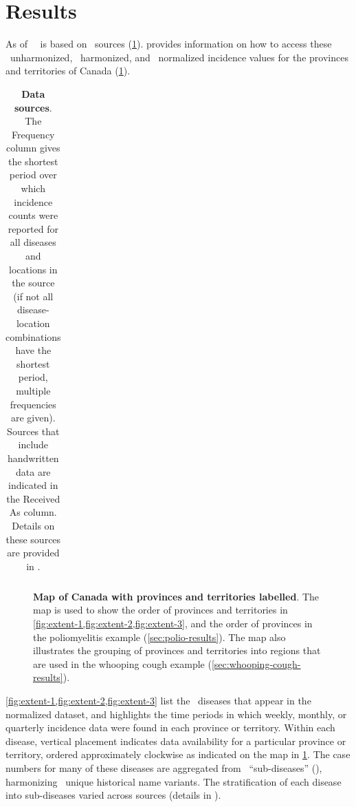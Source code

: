 \documentclass[12pt]{article}
\begin{document}
\section{Results}\label{sec:results}

As of \asofnow\ \datacronym\ is based on \ sources (\cref{tab:sources-table}).  provides information on how to access these \ unharmonized, \ harmonized, and \ normalized incidence values for the provinces and territories of Canada (\cref{fig:map}).

\begin{table}[!htb]
  \centering
  \caption{\textbf{Data sources}. The Frequency column gives the shortest period over which incidence counts were reported for all diseases and locations in the source (if not all disease-location combinations have the shortest period, multiple frequencies are given). Sources that include handwritten data are indicated in the Received As column. Details on these sources are provided in .} 
  \begin{tabular}{ll>{\raggedright\arraybackslash}p{0.11\linewidth}>{\raggedright\arraybackslash}p{0.25\linewidth}>{\raggedright\arraybackslash}p{0.2\linewidth}}  

\end{tabular}
\label{tab:sources-table}
\end{table}

\begin{figure}[!htb]
\caption{\textbf{Map of Canada with provinces and territories labelled}. The map is used to show the order of provinces and territories in \cref{fig:extent-1,fig:extent-2,fig:extent-3}, and the order of provinces in the poliomyelitis example (\cref{sec:polio-results}). The map also illustrates the grouping of provinces and territories into regions that are used in the whooping cough example (\cref{sec:whooping-cough-results}).}\label{fig:map}
\end{figure}

\newpage 

\cref{fig:extent-1,fig:extent-2,fig:extent-3} list the \ diseases that appear in the normalized dataset, and highlights the time periods in which weekly, monthly, or quarterly incidence data were found in each province or territory. Within each disease, vertical placement indicates data availability for a particular province or territory, ordered approximately clockwise as indicated on the map in \cref{fig:map}. The case numbers for many of these diseases are aggregated from \ ``sub-diseases'' (), harmonizing \ unique historical name variants. The stratification of each disease into sub-diseases varied across sources (details in ).
\end{document}
